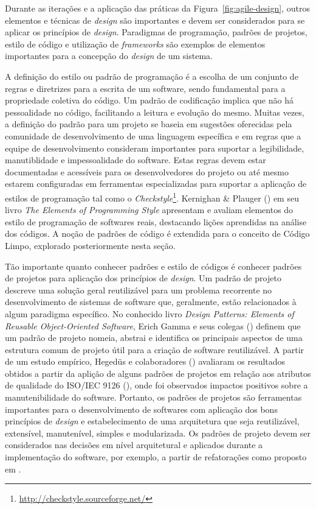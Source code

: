 %

Durante as iterações e a aplicação das práticas da Figura~\ref{fig:agile-design}, outros elementos e técnicas de \emph{design} são importantes e devem ser considerados para se aplicar os princípios de \emph{design}. Paradigmas de programação, padrões de projetos, estilo de código e utilização de \emph{frameworks} são exemplos de elementos importantes para a concepção do \emph{design} de um sistema.

%

A definição do estilo ou padrão de programação é a escolha de um conjunto de regras e diretrizes para a escrita de um software, sendo fundamental para a propriedade coletiva do código. Um padrão de codificação implica que não há pessoalidade no código, facilitando a leitura e evolução do mesmo. Muitas vezes, a definição do padrão para um projeto se baseia em sugestões oferecidas pela comunidade de desenvolvimento de uma linguagem específica e em regras que a equipe de desenvolvimento consideram importantes para suportar a legibilidade, manutiblidade e impessoalidade do software. Estas regras devem estar documentadas e acessíveis para os desenvolvedores do projeto ou até mesmo estarem configuradas em ferramentas especializadas para suportar a aplicação de estilos de programação tal como o \emph{Checkstyle}\footnote{\url{http://checkstyle.sourceforge.net/}}. Kernighan \& Plauger (\citeyear{kernighan1978}) em seu livro \emph{The Elements of Programming Style} apresentam e avaliam elementos do estilo de programação de softwares reais, destacando lições aprendidas na análise dos códigos. A noção de padrões de código é extendida para o conceito de Código Limpo, explorado posteriormente nesta seção.

%

Tão importante quanto conhecer padrões e estilo de códigos é conhecer padrões de projetos para aplicação dos princípios de \emph{design}. Um padrão de projeto descreve uma solução geral reutilizável para um problema recorrente no desenvolvimento de sistemas de software que, geralmente, estão relacionados à algum paradigma específico. No conhecido livro \emph{Design Patterns: Elements of Reusable Object-Oriented Software}, Erich Gamma e seus colegas (\citeyear{gof1994}) definem que um padrão de projeto nomeia, abstrai e identifica os principais aspectos de uma estrutura comum de projeto útil para a criação de software reutilizável. A partir de um estudo empírico, Hegedüs e colaboradores (\citeyear{hegedus2012}) avaliaram os resultados obtidos a partir da aplição de alguns padrões de projetos em relação aos atributos de qualidade do ISO/IEC 9126 (\citeyear{iso9126}), onde foi observados impactos positivos sobre a manutenibilidade do software. Portanto, os padrões de projetos são ferramentas importantes para o desenvolvimento de softwares com aplicação dos bons princípios de \emph{design} e estabelecimento de uma arquitetura que seja reutilizável, extensível, manutenível, simples e modularizada. Os padrões de projeto devem ser considerados nas decisões em nível arquitetural e aplicados durante a implementação do software, por exemplo, a partir de refatorações como proposto em \cite{kerievsky2008}.


